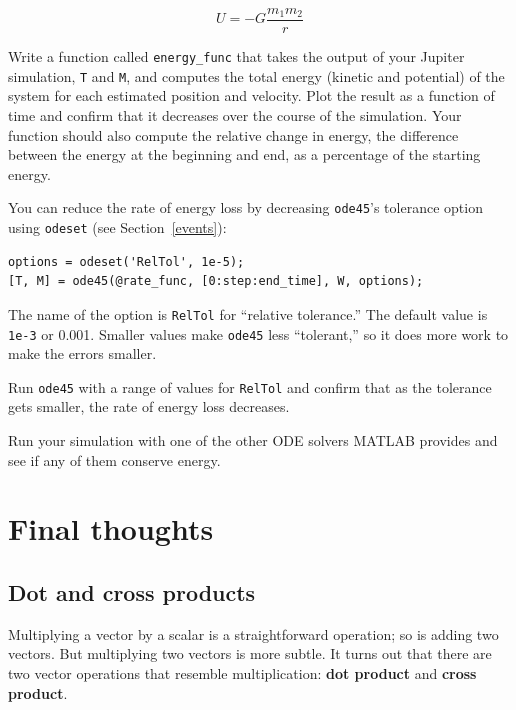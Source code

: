 \documentclass{book}
\begin{document}
\[ U = -G \frac{m_1 m_2}{r}  \]
%

\begin{ex}
Write a function called {\tt energy\_func} that takes the output of
your Jupiter simulation, {\tt T} and {\tt M}, and computes the total
energy (kinetic and potential) of the system for each estimated
position and velocity.  Plot the result as a function of time and
confirm that it decreases over the course of the simulation.  Your
function should also compute the relative change in energy, the
difference between the energy at the beginning and end, as a
percentage of the starting energy.
\end{ex}

You can reduce the rate of energy loss by decreasing {\tt ode45}'s
tolerance option using {\tt odeset} (see Section~\ref{events}):

\begin{verbatim}
options = odeset('RelTol', 1e-5);
[T, M] = ode45(@rate_func, [0:step:end_time], W, options);
\end{verbatim}
%
The name of the option is {\tt RelTol} for ``relative tolerance.''
The default value is {\tt 1e-3} or 0.001.  Smaller values
make {\tt ode45} less ``tolerant,'' so it does more work to
make the errors smaller.  

\begin{ex}
Run {\tt ode45} with a range of values for {\tt RelTol} and confirm
that as the tolerance gets smaller, the rate of energy loss
decreases.
\end{ex}

\begin{ex}
Run your simulation with one of the other ODE solvers MATLAB provides
and see if any of them conserve energy.
\end{ex}



\chapter{Final thoughts}

\section{Dot and cross products}

Multiplying a vector by a scalar is a straightforward operation;
so is adding two vectors.  But multiplying two vectors is more
subtle.  It turns out that there are two vector operations that
resemble multiplication: {\bf dot product}
and {\bf cross product}.
\end{document}
